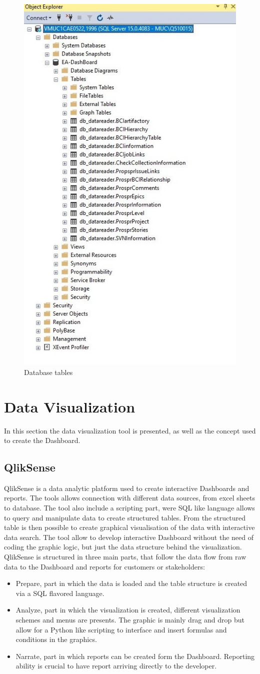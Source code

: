 \documentclass[../main.tex]{subfiles}
\begin{document}
\begin{figure}[H]
    \centering
    \includegraphics[width=0.5\linewidth]{images_folder/databasetable.jpg}
    \caption{Database tables}
    \label{fig:dbtables}
\end{figure} 

\section{Data Visualization}
In this section the data visualization tool is presented, as well as the concept used to create the Dashboard. 
\subsection{QlikSense}
QlikSense is a data analytic platform used to create interactive Dashboards and reports. The tools allows connection with different data sources, from excel sheets to database. The tool also include a scripting part, were SQL like language allows to query and manipulate data to create structured tables. From the structured table is then possible to create graphical visualisation of the data with interactive data search. The tool allow to develop interactive Dashboard without the need of coding the graphic logic, but just the data structure behind the visualization.\\
QlikSense is structured in three main parts, that follow the data flow from raw data to the Dashboard and reports for customers or stakeholders:
\begin{itemize}
    \item Prepare, part in which the data is loaded and the table structure is created via a SQL flavored language. 
    \item Analyze, part in which the visualization is created, different visualization schemes and menus are presents. The graphic is mainly drag and drop but allow for a Python like scripting to interface and insert formulas and conditions in the graphics.
    \item Narrate, part in which reports can be created form the Dashboard. Reporting ability is crucial to have report arriving directly to the developer.  
\end{itemize}
\end{document}
